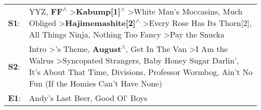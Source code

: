 \begin{supertabular}{p{0.03\textwidth}p{0.92\textwidth}}
 \textbf{S1}:  &                    YYZ\textsuperscript{}, \enspace \textbf{FF\textsuperscript{$\wedge$}} \textgreater \enspace \textbf{Kabump[1]\textsuperscript{$\wedge$}} \textgreater \enspace White Man's Moccasins\textsuperscript{}, \enspace Much Obliged\textsuperscript{} \textgreater \enspace \textbf{Hajimemashite[2]\textsuperscript{$\wedge$}} \textgreater \enspace Every Rose Has Its Thorn[2]\textsuperscript{}, \enspace All Things Ninja\textsuperscript{}, \enspace Nothing Too Fancy\textsuperscript{} \textgreater \enspace Pay the Snucka\textsuperscript{}  \enspace  \\
 \textbf{S2}:  &  Intro\textsuperscript{} \textgreater {}'s Theme\textsuperscript{}, \enspace \textbf{August\textsuperscript{$\wedge$}}, \enspace Get In The Van\textsuperscript{} \textgreater \enspace I Am the Walrus\textsuperscript{} \textgreater \enspace Syncopated Strangers\textsuperscript{}, \enspace Baby Honey Sugar Darlin'\textsuperscript{}, \enspace It's About That Time\textsuperscript{}, \enspace Divisions\textsuperscript{}, \enspace Professor Wormbog\textsuperscript{}, \enspace Ain't No Fun (If the Homies Can't Have None)\textsuperscript{}  \enspace  \\
 \textbf{E1}:  &                                                                                                                                                                                                                                                                                                                                                                                                                                                                                       Andy's Last Beer\textsuperscript{}, \enspace Good Ol' Boys\textsuperscript{}  \enspace  \\
\end{supertabular}
